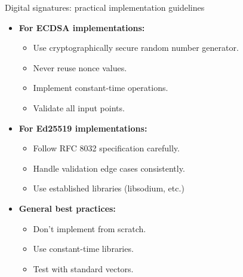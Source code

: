 \documentclass[aspectratio=169, lualatex, handout]{beamer}
\begin{document}
\begin{frame}{Digital signatures: practical implementation guidelines}
	\begin{itemize}[<+->]
		\item \textbf{For ECDSA implementations:}
		      \begin{itemize}
			      \item Use cryptographically secure random number generator.
			      \item Never reuse nonce values.
			      \item Implement constant-time operations.
			      \item Validate all input points.
		      \end{itemize}
		\item \textbf{For Ed25519 implementations:}
		      \begin{itemize}
			      \item Follow RFC 8032 specification carefully.
			      \item Handle validation edge cases consistently.
			      \item Use established libraries (libsodium, etc.)
		      \end{itemize}
		\item \textbf{General best practices:}
		      \begin{itemize}
			      \item Don't implement from scratch.
			      \item Use constant-time libraries.
			      \item Test with standard vectors.
		      \end{itemize}
	\end{itemize}
\end{frame}
\end{document}
